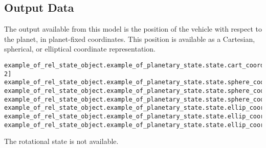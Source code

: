 \subsection{Output Data}
The output available from this model is the position of the vehicle with respect to the planet, in planet-fixed coordinates.  This position is available as a Cartesian, spherical, or elliptical coordinate representation.
\begin{verbatim}
example_of_rel_state_object.example_of_planetary_state.state.cart_coords[0-2]
example_of_rel_state_object.example_of_planetary_state.state.sphere_coords.altitude
example_of_rel_state_object.example_of_planetary_state.state.sphere_coords.latitude
example_of_rel_state_object.example_of_planetary_state.state.sphere_coords.longitude
example_of_rel_state_object.example_of_planetary_state.state.ellip_coords.altitude
example_of_rel_state_object.example_of_planetary_state.state.ellip_coords.latitude
example_of_rel_state_object.example_of_planetary_state.state.ellip_coords.longitude
\end{verbatim}

The rotational state is not available.